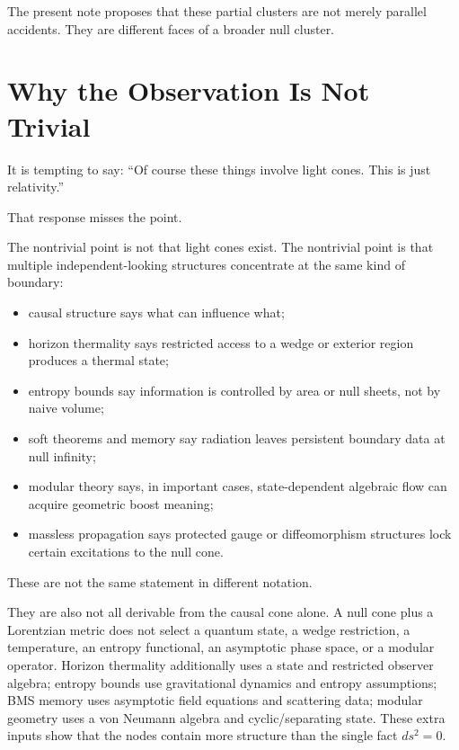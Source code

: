 \documentclass[12pt,a4paper]{article}
\theoremstyle{definition}
\theoremstyle{remark}
\newcommand{\tightlist}{%
  \setlength{\itemsep}{0pt}\setlength{\parskip}{0pt}}
\begin{document}
The present note proposes that these partial clusters are not merely
parallel accidents. They are different faces of a broader null cluster.

\section{Why the Observation Is Not
Trivial}\label{why-the-observation-is-not-trivial}

It is tempting to say: ``Of course these things involve light cones.
This is just relativity.''

That response misses the point.

The nontrivial point is not that light cones exist. The nontrivial point
is that multiple independent-looking structures concentrate at the same
kind of boundary:

\begin{itemize}
\tightlist
\item
  causal structure says what can influence what;
\item
  horizon thermality says restricted access to a wedge or exterior
  region produces a thermal state;
\item
  entropy bounds say information is controlled by area or null sheets,
  not by naive volume;
\item
  soft theorems and memory say radiation leaves persistent boundary data
  at null infinity;
\item
  modular theory says, in important cases, state-dependent algebraic
  flow can acquire geometric boost meaning;
\item
  massless propagation says protected gauge or diffeomorphism structures
  lock certain excitations to the null cone.
\end{itemize}

These are not the same statement in different notation.

They are also not all derivable from the causal cone alone.  A null cone plus a Lorentzian metric does not select a quantum state, a wedge restriction, a temperature, an entropy functional, an asymptotic phase space, or a modular operator.  Horizon thermality additionally uses a state and restricted observer algebra; entropy bounds use gravitational dynamics and entropy assumptions; BMS memory uses asymptotic field equations and scattering data; modular geometry uses a von Neumann algebra and cyclic/separating state.  These extra inputs show that the nodes contain more structure than the single fact $ds^2=0$.
\end{document}
